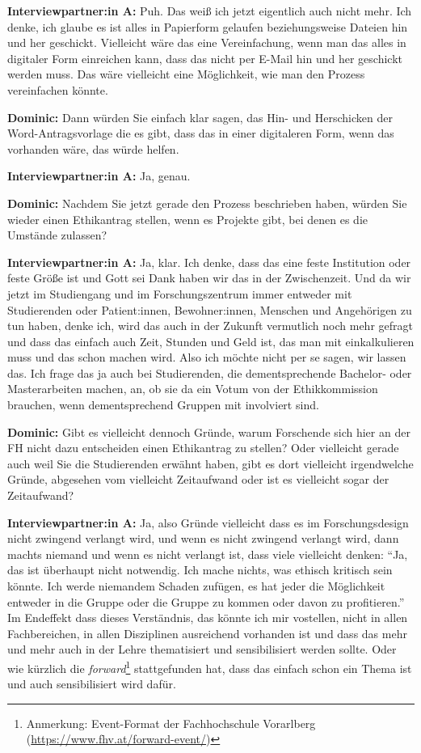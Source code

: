 \documentclass[a4paper,12pt,twoside]{scrreprt}
\begin{document}
\textbf{Interviewpartner:in A:} Puh. Das weiß ich jetzt eigentlich auch nicht mehr. Ich denke, ich glaube es ist alles in Papierform gelaufen beziehungsweise Dateien hin und her geschickt. Vielleicht wäre das eine Vereinfachung, wenn man das alles in digitaler Form einreichen kann, dass das nicht per E-Mail hin und her geschickt werden muss. Das wäre vielleicht eine Möglichkeit, wie man den Prozess vereinfachen könnte.

\textbf{Dominic:} Dann würden Sie einfach klar sagen, das Hin- und Herschicken der Word-Antragsvorlage die es gibt, dass das in einer digitaleren Form, wenn das vorhanden wäre, das würde helfen.

\textbf{Interviewpartner:in A:} Ja, genau.

\textbf{Dominic:} Nachdem Sie jetzt gerade den Prozess beschrieben haben, würden Sie wieder einen Ethikantrag stellen, wenn es Projekte gibt, bei denen es die Umstände zulassen?

\textbf{Interviewpartner:in A:} Ja, klar. Ich denke, dass das eine feste Institution oder feste Größe ist und Gott sei Dank haben wir das in der Zwischenzeit. Und da wir jetzt im Studiengang und im Forschungszentrum immer entweder mit Studierenden oder Patient:innen, Bewohner:innen, Menschen und Angehörigen zu tun haben, denke ich, wird das auch in der Zukunft vermutlich noch mehr gefragt und dass das einfach auch Zeit, Stunden und Geld ist, das man mit einkalkulieren muss und das schon machen wird. Also ich möchte nicht per se sagen, wir lassen das. Ich frage das ja auch bei Studierenden, die dementsprechende Bachelor- oder Masterarbeiten machen, an, ob sie da ein Votum von der Ethikkommission brauchen, wenn dementsprechend Gruppen mit involviert sind.

\textbf{Dominic:} Gibt es vielleicht dennoch Gründe, warum Forschende sich hier an der FH nicht dazu entscheiden einen Ethikantrag zu stellen? Oder vielleicht gerade auch weil Sie die Studierenden erwähnt haben, gibt es dort vielleicht irgendwelche Gründe, abgesehen vom vielleicht Zeitaufwand oder ist es vielleicht sogar der Zeitaufwand?

\textbf{Interviewpartner:in A:} Ja, also Gründe vielleicht dass es im Forschungsdesign nicht zwingend verlangt wird, und wenn es nicht zwingend verlangt wird, dann machts niemand und wenn es nicht verlangt ist, dass viele vielleicht denken: \enquote{Ja, das ist überhaupt nicht notwendig. Ich mache nichts, was ethisch kritisch sein könnte. Ich werde niemandem Schaden zufügen, es hat jeder die Möglichkeit entweder in die Gruppe oder die Gruppe zu kommen oder davon zu profitieren.} Im Endeffekt dass dieses Verständnis, das könnte ich mir vostellen, nicht in allen Fachbereichen, in allen Disziplinen ausreichend vorhanden ist und dass das mehr und mehr auch in der Lehre thematisiert und sensibilisiert werden sollte. Oder wie kürzlich die \textit{forward}\footnote{Anmerkung: Event-Format der Fachhochschule Vorarlberg (\url{https://www.fhv.at/forward-event/})} stattgefunden hat, dass das einfach schon ein Thema ist und auch sensibilisiert wird dafür.
\end{document}
